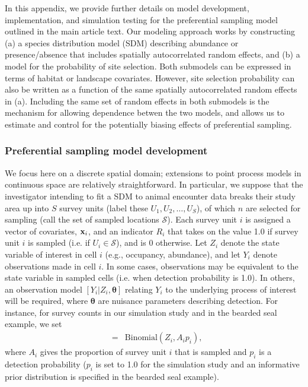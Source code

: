 \documentclass[times,mee,doublespace,]{besauth2}
\begin{document}
\begin{flushleft}

\raggedbottom

In this appendix, we provide further details on model development, implementation, and simulation testing for the preferential sampling model outlined in the main article text. Our modeling approach works by constructing (a) a species distribution model (SDM) describing abundance or presence/absence that includes spatially autocorrelated random effects, and (b) a model for the probability of site selection.  Both submodels can be expressed in terms of habitat or landscape covariates.  However, site selection probability can also be written as a function of the same spatially autocorrelated random effects in (a).  Including the same set of random effects in both submodels is the mechanism for allowing dependence betwen the two models, and allows us to estimate and control for the potentially biasing effects of preferential sampling.

\subsubsection*{Preferential sampling model development}

We focus here on a discrete spatial domain; extensions to point process models in continuous space are relatively straightforward.  In particular, we suppose that the investigator intending to fit a SDM to animal encounter data breaks their study area up into $S$ survey units (label these $U_1, U_2, \hdots, U_S$), of which $n$ are selected for sampling (call the set of sampled locations $\mathcal{S}$). 
Each survey unit $i$ is assigned a vector of covariates, ${\bf x}_i$, and an indicator $R_i$ that takes on the value 1.0 if survey unit $i$ is sampled (i.e. if $U_i \in \mathcal{S}$), and is 0 otherwise.  Let $Z_i$ denote the state variable of interest in cell $i$ (e.g., occupancy, abundance), and let $Y_i$ denote observations made in cell $i$.  In some cases, observations may be equivalent to the state variable in sampled cells (i.e. when detection probability is 1.0).  In others, an observation model $[Y_i | Z_i, \boldsymbol{\theta}]$ relating $Y_i$ to the underlying process of interest will be required, where $\boldsymbol{\theta}$ are nuisance parameters describing detection.  For instance, for survey counts in our simulation study and in the bearded seal example, we set 
\begin{eqnarray*}
  [Y_i | Z_i, \boldsymbol{\theta}] & = & \textrm{Binomial}(Z_i, A_i p_i),
\end{eqnarray*}
where $A_i$ gives the proportion of survey unit $i$ that is sampled and $p_i$ is a detection probability ($p_i$ is set to 1.0 for the simulation study and an informative prior distribution is specified in the bearded seal example).


\end{flushleft}
\end{document}
